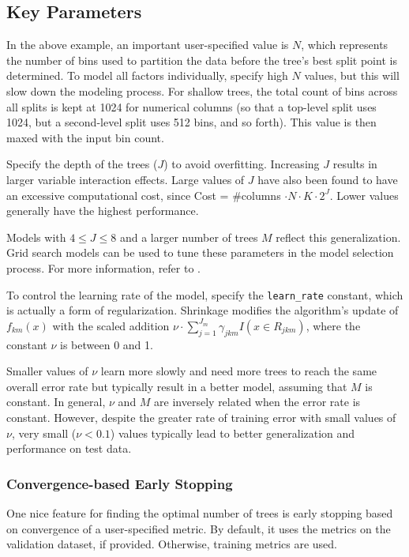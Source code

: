\newpage
\subsection{Key Parameters}
\label{ssec:Key parameters}
\raggedbottom
In the above example, an important user-specified value is $N$, which represents the number of bins used to partition the data before the tree's best split point is determined. To model all factors individually, specify high $N$ values, but this will slow down the modeling process. For shallow trees,  the total count of bins across all splits is kept at 1024  for numerical columns (so that a top-level split uses 1024, but a second-level split uses 512 bins, and so forth). This value is then maxed with the input bin count.

Specify the depth of the trees ($J$) to avoid overfitting. Increasing $J$ results in larger variable interaction effects. Large values of $J$ have also been found to have an excessive computational cost,
since Cost = \#columns $\cdot N \cdot K \cdot 2^{J}$. Lower values generally have the highest
performance. 

Models with $4 \leq J \leq 8$ and a larger number of trees $M$ reflect this generalization.
Grid search models can be used to tune these parameters in the model selection process. For more information, refer to {\textbf{}}. 

To control the learning rate of the model, specify the \texttt{learn\_rate} constant, which is actually a
form of regularization. Shrinkage modifies the algorithm's update of $f_{km}(x)$ with the scaled
addition $\nu \cdot \sum_{j=1}^{J_m} \gamma_{jkm} I(x \in R_{jkm})$, where the constant $\nu$ is between 0 and 1. 

Smaller values of $\nu$ learn more slowly and need more trees to reach the same overall error rate but typically result in a better model, assuming that $M$ is constant. In general, $\nu$ and $M$ are inversely related when the error rate is  constant. However, despite the greater rate of training error with small values of $\nu$, very small ($\nu < 0.1$) values typically lead to better generalization and performance on test data.

\newpage
\subsubsection{Convergence-based Early Stopping}
One nice feature for finding the optimal number of trees is early stopping based on convergence of a user-specified metric. By default, it uses the metrics on the validation dataset, if provided. Otherwise, training metrics are used.


